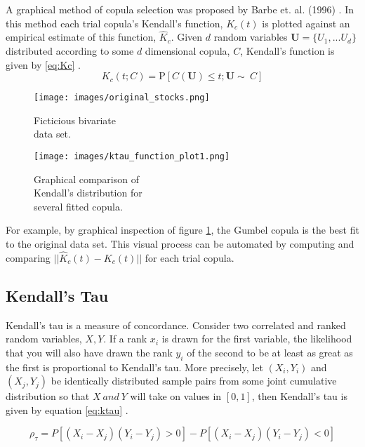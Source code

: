 A graphical method of copula selection was proposed by Barbe et. al. (1996) \cite{Barbe1996}.  In this method each trial copula's Kendall's function, $K_c(t)$ is plotted against an empirical estimate of this function, $\hat K_c$.  Given $d$ random variables $\mathbf U=\{U_1, ... U_d\}$ distributed according to some $d$ dimensional copula, $C$, Kendall's function is given by \ref{eq:Kc} \cite{Joe2015}.
\begin{equation}
K_c(t; C) = \mathrm P \left[C(\mathbf U) \leq t; \mathbf{U} \sim\ C\right]
\label{eq:Kc}
\end{equation}

\begin{figure}[!htbp]
	\centering
	\begin{minipage}{.45\textwidth}
		\texttt{[image: images/original\_stocks.png]}
		\caption{Ficticious bivariate \\ data set.}
		\label{fig:biv_data_ex}
	\end{minipage}%
	\begin{minipage}{.45\textwidth}
		\texttt{[image: images/ktau\_function\_plot1.png]}
		\caption{Graphical comparison of  \\ Kendall's distribution for \\ several fitted copula.}
		\label{fig:kc_fn_compare}
	\end{minipage}
\end{figure}
For example, by graphical inspection of figure \ref{fig:kc_fn_compare}, the Gumbel copula is the best fit to the original data set.  This visual process can be automated by computing and comparing $||\hat K_c(t) - K_c(t)||$ for each trial copula.

\subsection*{Kendall's Tau}

Kendall's tau is a measure of concordance.  Consider two correlated and ranked random variables, $X, Y$.
If a rank $x_i$ is drawn for the first variable, the likelihood that you will also have drawn the rank $y_i$ of the second to be at least as great as the first is proportional to Kendall's tau.  More precisely, let $(X_i, Y_i)$ and $(X_j, Y_j)$ be identically distributed sample pairs from some joint cumulative distribution so that $X\ and\ Y$ will take on values in $[0,1]$, then Kendall's tau is given by equation \ref{eq:ktau} \cite{Nelsen2006}.  

\begin{equation}
\rho_\tau = P[(X_i - X_j)(Y_i-Y_j)>0] - P[(X_i - X_j)(Y_i - Y_j)<0]
\label{eq:ktau}
\end{equation}

